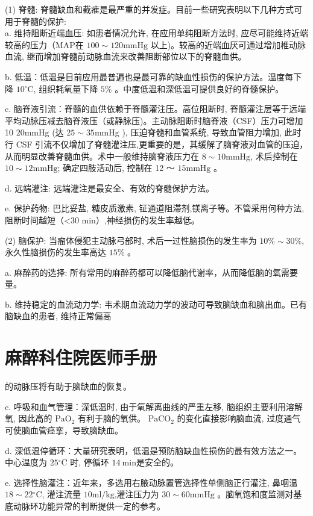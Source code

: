 \documentclass[10pt]{article}
\begin{document}
(1) 脊髓: 脊髓缺血和截痽是最严重的并发症。目前一些研究表明以下几种方式可用于脊髓的保护:\\
a. 维持阻断近端血压: 如患者情况允许, 在应用单纯阻断方法时, 应尽可能维持近端较高的压力（MAP在 $100 \sim 120 \mathrm{mmHg}$ 以上)。较高的近端血厌可通过增加椎动脉血流, 继而增加脊髓前动脉血流来改善阻断部位以下的脊髓血供。

b. 低温：低温是目前应用最普遍也是最可靠的缺血性损伤的保护方法。温度每下降 $10{ }^{\circ} \mathrm{C}$, 组织耗氧量下降 $5 \%$ 。中度低温和深低温可提供良好的脊髓保护。

c. 脑脊液引流：脊髓的血供依赖于脊髓灌注压。高位阻断时, 脊髓灌注层等于远端平均动脉压减去脑脊液压（或静脉压)。主动脉阻断时脑脊液（CSF）压力可增加 10 $20 \mathrm{mmHg}$ (达 $25 \sim 35 \mathrm{mmHg}$ ), 压迫脊髓和血管系统, 导致血管阻力增加, 此时行 CSF 引流不仅增加了脊髓灌注压,更重要的是，其缓解了脑脊液对血管的压迫，从而明显改善脊髓血供。术中一般维持脑脊液压力在 $8 \sim 10 \mathrm{mmHg}$, 术后控制在 $10 \sim 12 \mathrm{mmHg}$; 确定四肢活动后, 控制在 12 〜 $15 \mathrm{mmHg}$ 。

d. 远端灌注: 远端灌注是最安全、有效的脊髓保护方法。

e. 保护药物: 巴比妥盐, 糖皮质激素, 钲通道阻滞剂,镁离子等。不管采用何种方法, 阻断时间越短（<30 min）,神经损伤的发生率越低。

(2) 脑保护: 当瘤体侵犯主动脉弓部时, 术后一过性脑损伤的发生率为 $10 \% \sim 30 \%$, 永久性脑损伤的发生率高达 $15 \%$ 。

a. 麻醉药的选择: 所有常用的麻醉药都可以降低脑代谢率，从而降低脑的氧需要量。

b. 维持稳定的血流动力学: 韦术期血流动力学的波动可导致脑缺血和脑出血。已有脑缺血的患者, 维持正常偏高

\section*{麻醉科住院医师手册}
的动脉压将有助于脑缺血的恢复。

c. 呼吸和血气管理：深低温时, 由于氧解离曲线的严重左移, 脑组织主要利用溶解氧, 因此高的 $\mathrm{PaO}_{2}$ 有利于脑的氧供。 $\mathrm{PaCO}_{2}$ 的变化直接影响脑血流, 过度通气可使脑血管痉挛，导致脑缺血。

d. 深低温停循环：大量研究表明，低温是预防脑缺血性损伤的最有效方法之一。中心温度为 $25{ }^{\circ} \mathrm{C}$ 时, 停循环 $14 \mathrm{~min}$是安全的。

e. 选择性脑灌注：近年来，多选用右腋动脉置管选择性单侧脑正行灌注, 鼻咽温 $18 \sim 22{ }^{\circ} \mathrm{C}$, 灌注流量 $10 \mathrm{ml} / \mathrm{kg}$,灌注压力为 $30 \sim 60 \mathrm{mmHg}$ 。脑氧饱和度监测对基底动脉环功能异常的判断提供一定的参考。
\end{document}
